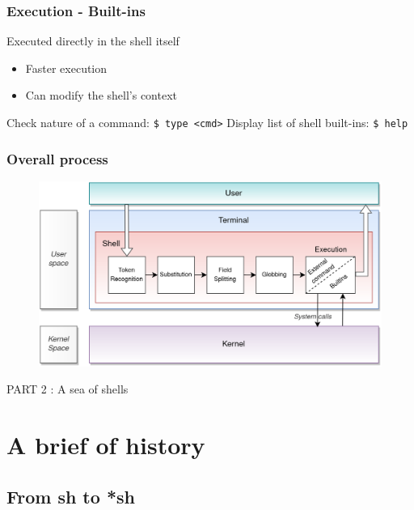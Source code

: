 \documentclass[aspectratio=169,10pt]{beamer}
\begin{document}
\begin{frame}
    \frametitle{Execution - Built-ins}

    Executed directly in the shell itself
    \begin{itemize}
        \item Faster execution
        \item Can modify the shell's context
    \end{itemize}

    \vspace{\baselineskip}

    Check nature of a command: \lstinline{$ type <cmd>}
    \newline
    Display list of shell built-ins: \lstinline{$ help}
\end{frame}


\begin{frame}
  \frametitle{Overall process}
    \begin{figure}[h]
        \includegraphics[scale=0.8]{./images/ShellStepsGlobal}
    \end{figure}
\end{frame}

\begin{frame}[c]
    \begin{center}
        \huge PART 2 : A sea of shells
    \end{center}
\end{frame}

\section{A brief of history}
\subsection{From sh to *sh}
\end{document}
